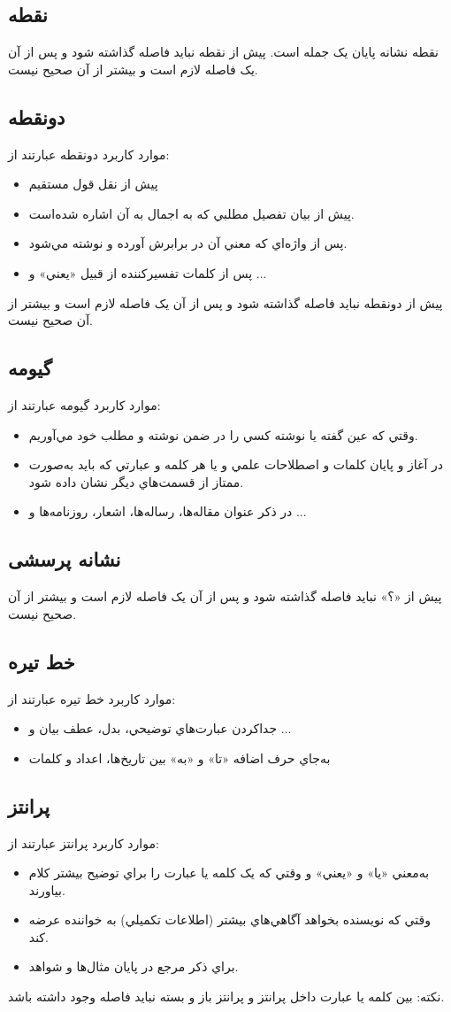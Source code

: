 \subsection{نقطه}
نقطه نشانه پایان یک جمله است. پیش از نقطه نبايد فاصله گذاشته شود و پس از آن يک فاصله لازم است و بيشتر از آن صحیح نیست.
\subsection{دونقطه}
موارد کاربرد دونقطه عبارتند از:
\begin{itemize}
\item
پيش از نقل قول مستقيم
\item
پيش از بيان تفصيل مطلبي که به اجمال به آن اشاره شده‌است.
\item
پس از واژه‌اي که معني آن در برابرش آورده و نوشته مي‌شود.
\item
پس از کلمات تفسير‌کننده از قبيل «يعني» و ...
\end{itemize}
پیش از دونقطه نبايد فاصله گذاشته شود و پس از آن يک فاصله لازم است و بيشتر از آن صحیح نیست.
\subsection{گیومه}
موارد کاربرد گیومه عبارتند از:
\begin{itemize}
\item
وقتي که عين گفته يا نوشته کسي را در ضمن نوشته و مطلب خود مي‌آوريم. 
\item
در آغاز و پايان کلمات و اصطلاحات علمي و يا هر کلمه و عبارتي که بايد به‌صورت ممتاز از قسمت‌هاي ديگر نشان داده شود.
\item
در ذکر عنوان مقاله‌ها، رساله‌ها، اشعار، روزنامه‌ها و ...
\end{itemize}
\subsection{نشانه پرسشی}
پیش از «؟» نبايد فاصله گذاشته شود و پس از آن يک فاصله لازم است و بيشتر از آن صحیح نیست.
\subsection{خط تیره}
موارد کاربرد خط تیره عبارتند از:
\begin{itemize}
\item
جدا‌کردن عبارت‌هاي توضيحي، بدل، عطف بيان و ...
\item
به‌جاي حرف اضافه «تا» و «به» بين تاريخ‌ها، اعداد و کلمات
\end{itemize}
\subsection{پرانتز}
موارد کاربرد پرانتز عبارتند از:
\begin{itemize}
\item
به‌معني «يا» و «يعني» و وقتي که یک کلمه يا عبارت را براي توضيح بيشتر کلام بياورند.
\item
وقتي که نويسنده بخواهد آگاهي‌هاي بيشتر (اطلاعات تکميلي) به خواننده عرضه کند.
\item
براي ذکر مرجع در پايان مثال‌ها و شواهد.
\end{itemize}
نکته: بین کلمه یا عبارت داخل پرانتز و پرانتز باز و بسته نباید فاصله وجود داشته باشد.
